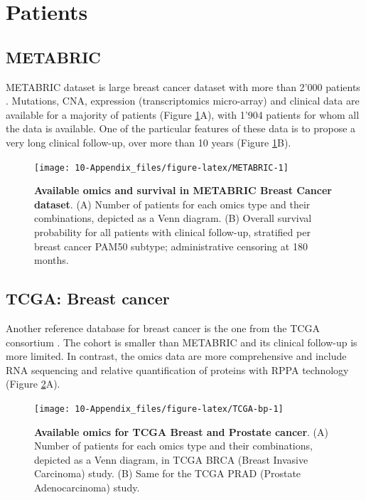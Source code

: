 \documentclass[a4paper,12pt,twoside,onecolumn,openright,final,oldfontcommands]{memoir}
\begin{document}
\section{Patients}\label{appendix-datasets-patients}

\subsection{METABRIC}\label{metabric}

METABRIC dataset is large breast cancer dataset with more than 2'000
patients \citep{pereira2016somatic}. Mutations, CNA, expression
(transcriptomics micro-array) and clinical data are available for a
majority of patients (Figure \ref{fig:METABRIC}A), with 1'904 patients
for whom all the data is available. One of the particular features of
these data is to propose a very long clinical follow-up, over more than
10 years (Figure \ref{fig:METABRIC}B).

\begin{figure}

{\centering \texttt{[image: 10-Appendix\_files/figure-latex/METABRIC-1]} 

}

\caption[Available omics and survival in METABRIC Breast Cancer dataset]{\textbf{Available omics and survival in METABRIC
Breast Cancer dataset}. (A) Number of patients for each omics type and
their combinations, depicted as a Venn diagram. (B) Overall survival
probability for all patients with clinical follow-up, stratified per
breast cancer PAM50 subtype; administrative censoring at 180 months.}\label{fig:METABRIC}
\end{figure}







\subsection{TCGA: Breast cancer}\label{tcga-breast-cancer}

Another reference database for breast cancer is the one from the TCGA
consortium \citep{cancer2012comprehensive}. The cohort is smaller than
METABRIC and its clinical follow-up is more limited. In contrast, the
omics data are more comprehensive and include RNA sequencing and
relative quantification of proteins with RPPA technology (Figure
\ref{fig:TCGA-bp}A).

\begin{figure}

{\centering \texttt{[image: 10-Appendix\_files/figure-latex/TCGA-bp-1]} 

}

\caption[Available omics for TCGA Breast and Prostate cancer]{\textbf{Available omics for TCGA Breast and
Prostate cancer}. (A) Number of patients for each omics type and their
combinations, depicted as a Venn diagram, in TCGA BRCA (Breast Invasive
Carcinoma) study. (B) Same for the TCGA PRAD (Prostate Adenocarcinoma)
study.}\label{fig:TCGA-bp}
\end{figure}
\end{document}
